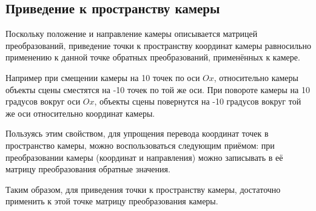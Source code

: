 \subsection{Приведение к пространству камеры}

Поскольку положение и направление камеры описывается матрицей преобразований, приведение точки к пространству координат камеры равносильно применению к данной точке обратных преобразований, применённых к камере.

Например при смещении камеры на 10 точек по оси $Ox$, относительно камеры объекты сцены сместятся на -10 точек по той же оси. При повороте камеры на 10 градусов вокруг оси $Ox$, объекты сцены повернутся на -10 градусов вокруг той же оси относительно координат камеры.

Пользуясь этим свойством, для упрощения перевода координат точек в пространство камеры, можно воспользоваться следующим приёмом: при преобразовании камеры (координат и направления) можно записывать в её матрицу преобразования обратные значения.

Таким образом, для приведения точки к пространству камеры, достаточно применить к этой точке матрицу преобразования камеры.